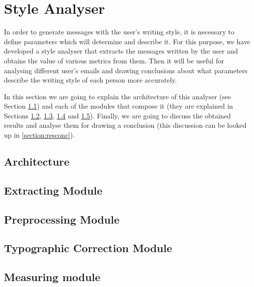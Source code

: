 \chapter{Style Analyser}
\label{cap:analyser}

In order to generate messages with the user's writing style, it is necessary to define parameters which will determine and describe it. For this purpose, we have developed a style analyser that extracts the messages written by the user and obtains the value of various metrics from them. Then it will be useful for analysing different user's emails and drawing conclusions about what parameters describe the writing style of each person more accurately.

In this section we are going to explain the architecture of this analyser (see Section \ref{section:stylearch}) and each of the modules that compose it (they are explained in Sections \ref{section:extmod}, \ref{section:prepmod}, \ref{section:typomod} and \ref{section:measmod}). Finally, we are going to discuss the obtained results and analyse them for drawing a conclusion (this discussion can be looked up in \ref{section:resconc}).

\section{Architecture} \label{section:stylearch}


\section{Extracting Module} \label{section:extmod}

\section{Preprocessing Module} \label{section:prepmod}

\section{Typographic Correction Module} \label{section:typomod}

\section{Measuring module} \label{section:measmod}

